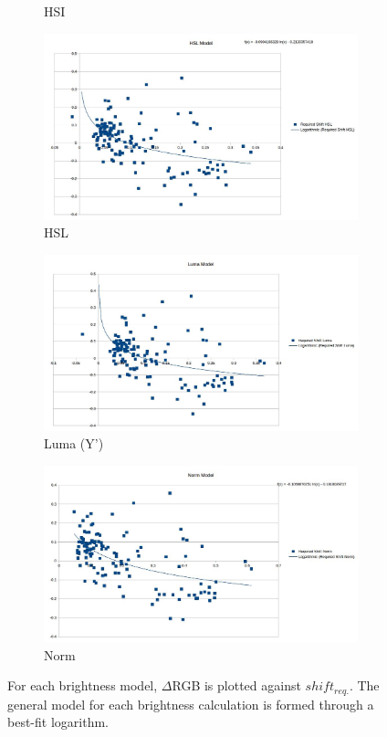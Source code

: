\begin{figure}
\begin{subfigure}{.49\linewidth}
  \caption{HSI}
\end{subfigure}
\hfill
\begin{subfigure}{.49\linewidth}
  \includegraphics[width=1\linewidth]{figures/model/scatter/model_hsl.jpg}
  \caption{HSL}
\end{subfigure}
\hfill
\begin{subfigure}{.49\linewidth}
  \includegraphics[width=1\linewidth]{figures/model/scatter/model_luma.jpg}
  \caption{Luma (Y')}
\end{subfigure}
\hfill
\begin{subfigure}{.49\linewidth}
  \includegraphics[width=1\linewidth]{figures/model/scatter/model_norm.jpg}
  \caption{Norm}
\end{subfigure}

\caption{For each brightness model, $\Delta$RGB is plotted against $shift_{req.}$. The general model for each brightness calculation is formed through a best-fit logarithm.}
\label{fig:model_scatter}
\end{figure}

